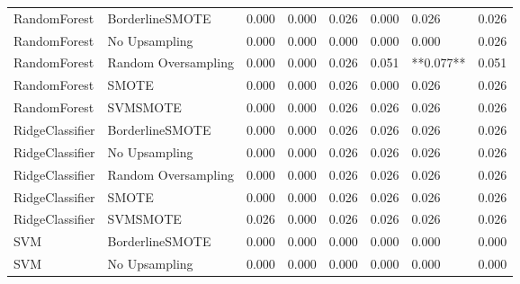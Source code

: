 \begin{tabular}{llllllll}
                RandomForest &     BorderlineSMOTE & 0.000 &                     0.000 &                 0.026 &                  0.000 &                                   0.026 &    0.026 \\
                RandomForest &       No Upsampling & 0.000 &                     0.000 &                 0.000 &                  0.000 &                                   0.000 &    0.026 \\
                RandomForest & Random Oversampling & 0.000 &                     0.000 &                 0.026 &                  0.051 &                               **0.077** &    0.051 \\
                RandomForest &               SMOTE & 0.000 &                     0.000 &                 0.026 &                  0.000 &                                   0.026 &    0.026 \\
                RandomForest &            SVMSMOTE & 0.000 &                     0.000 &                 0.026 &                  0.026 &                                   0.026 &    0.026 \\
             RidgeClassifier &     BorderlineSMOTE & 0.000 &                     0.000 &                 0.026 &                  0.026 &                                   0.026 &    0.026 \\
             RidgeClassifier &       No Upsampling & 0.000 &                     0.000 &                 0.026 &                  0.026 &                                   0.026 &    0.026 \\
             RidgeClassifier & Random Oversampling & 0.000 &                     0.000 &                 0.026 &                  0.026 &                                   0.026 &    0.026 \\
             RidgeClassifier &               SMOTE & 0.000 &                     0.000 &                 0.026 &                  0.026 &                                   0.026 &    0.026 \\
             RidgeClassifier &            SVMSMOTE & 0.026 &                     0.000 &                 0.026 &                  0.026 &                                   0.026 &    0.026 \\
                         SVM &     BorderlineSMOTE & 0.000 &                     0.000 &                 0.000 &                  0.000 &                                   0.000 &    0.000 \\
                         SVM &       No Upsampling & 0.000 &                     0.000 &                 0.000 &                  0.000 &                                   0.000 &    0.000 \\

\end{tabular}

